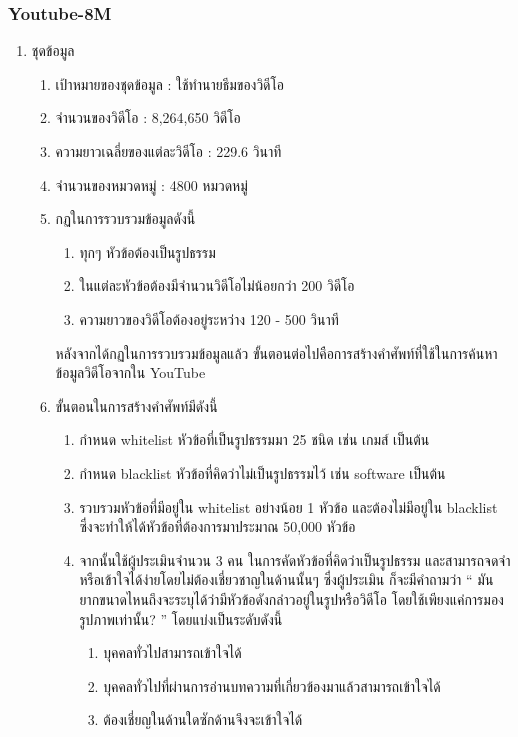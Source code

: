 \subsubsection*{Youtube-8M} 
\begin{enumerate}
	\item {ชุดข้อมูล}
	\begin{enumerate}
		\setlength\itemsep{-0.25em}
		\item เป้าหมายของชุดข้อมูล : ใช้ทำนายธีมของวิดีโอ
		\item จำนวนของวิดีโอ : 8,264,650 วิดีโอ
		\item ความยาวเฉลี่ยของแต่ละวิดีโอ : 229.6 วินาที
		\item จำนวนของหมวดหมู่ : 4800 หมวดหมู่
		\item กฏในการรวบรวมข้อมูลดังนี้
		\begin{enumerate}
			\setlength\itemsep{-0.25em}
			\item ทุกๆ หัวข้อต้องเป็นรูปธรรม
			\item ในแต่ละหัวข้อต้องมีจำนวนวิดีโอไม่น้อยกว่า 200 วิดีโอ
			\item ความยาวของวิดีโอต้องอยู่ระหว่าง 120 - 500 วินาที
		\end{enumerate}
		หลังจากได้กฏในการรวบรวมข้อมูลแล้ว ขั้นตอนต่อไปคือการสร้างคำศัพท์ที่ใช้ในการค้นหาข้อมูลวิดีโอจากใน YouTube 
		\item ขั้นตอนในการสร้างคำศัพท์มีดังนี้
		\begin{enumerate}
			\setlength\itemsep{-0.25em}
			\item กำหนด whitelist หัวข้อที่เป็นรูปธรรมมา 25 ชนิด เช่น เกมส์ เป็นต้น
			\item กำหนด blacklist หัวข้อที่คิดว่าไม่เป็นรูปธรรมไว้ เช่น software เป็นต้น
			\item รวบรวมหัวข้อที่มีอยู่ใน whitelist อย่างน้อย 1 หัวข้อ และต้องไม่มีอยู่ใน blacklist ซึ่งจะทำให้ได้หัวข้อที่ต้องการมาประมาณ 50,000 หัวข้อ
			\item จากนั้นใช้ผู้ประเมินจำนวน 3 คน ในการคัดหัวข้อที่คิดว่าเป็นรูปธรรม และสามารถจดจำหรือเข้าใจได้ง่ายโดยไม่ต้องเชี่ยวชาญในด้านนั้นๆ ซึ่งผู้ประเมิน ก็จะมีคำถามว่า “ มันยากขนาดไหนถึงจะระบุได้ว่ามีหัวข้อดังกล่าวอยู่ในรูปหรือวิดีโอ โดยใช้เพียงแค่การมองรูปภาพเท่านั้น? ” โดยแบ่งเป็นระดับดังนี้
			\begin{enumerate}
				\setlength\itemsep{-0.25em}
				\item บุคคลทั่วไปสามารถเข้าใจได้
				\item บุคคลทั่วไปที่ผ่านการอ่านบทความที่เกี่ยวข้องมาแล้วสามารถเข้าใจได้
				\item ต้องเชี่ยญในด้านใดซักด้านจึงจะเข้าใจได้

\end{enumerate}
\end{enumerate}
\end{enumerate}
\end{enumerate}
